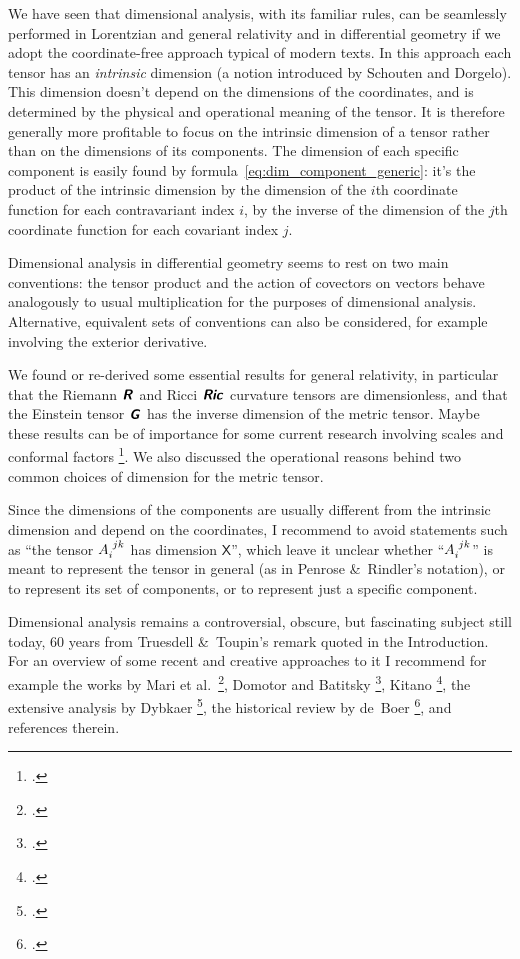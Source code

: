 \documentclass[a4paper,12pt,onecolumn,oneside,article,british]{memoir}
\makeatletter
\newcommand*{\mathte}[1]{\textbf{\textit{\textsf{#1}}}}
\newcommand*{\citep}{\footcites}
\newcommand*{\amp}{\&}
\newcommand*{\eg}{{e.g.}}
\newcommand*{\etal}{{et al.}}
\newcommand*{\q}{}%
\DeclareRobustCommand*{\q}{%
  \mathbin{\mathpalette\bigcdot@{}}%
}
\newcommand*{\bigcdot@scalefactor}{0.7}
\newcommand*{\bigcdot@widthfactor}{1.5}
\newcommand*{\bigcdot@}[2]{%
  \sbox0{$#1\vcenter{}$}%
  \sbox2{$#1\cdot\m@th$}%
  \hbox to \bigcdot@widthfactor\wd2{%
    \hfil
    \raise\ht0\hbox{%
      \scalebox{\bigcdot@scalefactor}{%
        \lower\ht0\hbox{$#1\bullet\m@th$}%
      }%
    }%
    \hfil
  }%
}
\newcommand*{\Xx}{\textsf{X}}
\newcommand*{\yG}{\mathte{G}}
\newcommand*{\yR}{\mathte{R}}
\newcommand*{\yRi}{\mathte{Ric}}
\renewcommand*{\i}{\indices}
\makeatother
\begin{document}
We have seen that dimensional analysis, with its familiar rules, can be
seamlessly performed in Lorentzian and general relativity and in
differential geometry if we adopt the coordinate-free approach typical of
modern texts. In this approach each tensor has an \emph{intrinsic}
dimension (a notion introduced by Schouten and Dorgelo). This dimension
doesn't depend on the dimensions of the coordinates, and is determined by
the physical and operational meaning of the tensor. It is therefore
generally more profitable to focus on the intrinsic dimension of a tensor
rather than on the dimensions of its components. The dimension of each
specific component is easily found by
formula~\eqref{eq:dim_component_generic}: it's the product of the intrinsic
dimension by the dimension of the $i$th coordinate function for each
contravariant index $i$, by the inverse of the dimension of the $j$th
coordinate function for each covariant index $j$.

Dimensional analysis in differential geometry seems to rest on two main
conventions: the tensor product and the action of covectors on vectors
behave analogously to usual multiplication for the purposes of dimensional
analysis. Alternative, equivalent sets of conventions can also be
considered, for example involving the exterior derivative.

We found or re-derived some essential results for general relativity, in
particular that the Riemann $\yR\i{^{\q}_{\q\q\q}}$ and Ricci
$\yRi\i{_{\q\q}}$ curvature tensors are dimensionless, and that the
Einstein tensor $\yG\i{_{\q}^{\q}}$ has the inverse dimension of the metric
tensor. Maybe these results can be of importance for some current research
involving scales and conformal factors
\citep[\eg][]{roehretal2005,cadonietal2019}. We also discussed the
operational reasons behind two common choices of dimension for the metric
tensor.

Since the dimensions of the components are usually different from the
intrinsic dimension and depend on the coordinates, I recommend to avoid
statements such as \enquote{the tensor $A\i{_{i}^{jk}}$ has dimension
  $\Xx$}, which leave it unclear whether \enquote{$A\i{_{i}^{jk}}$} is
meant to represent the tensor in general (as in Penrose \amp\ Rindler's
notation), or to represent its set of components, or to represent just a
specific component.

\medskip

Dimensional analysis remains a controversial, obscure, but fascinating
subject still today, 60 years from Truesdell \amp\ Toupin's remark quoted
in the Introduction. For an overview of some recent and creative approaches
to it I recommend for example the works by Mari \etal\
\citep{marietal2012,frigerioetal2010}, Domotor and Batitsky
\citep{domotor2017,domotoretal2016,domotor2012}, Kitano \citep{kitano2013},
the extensive analysis by Dybkaer \citep{dybkaer2004_r2010}, the historical
review by de~Boer \citep{deboer1995}, and references therein.
\end{document}
